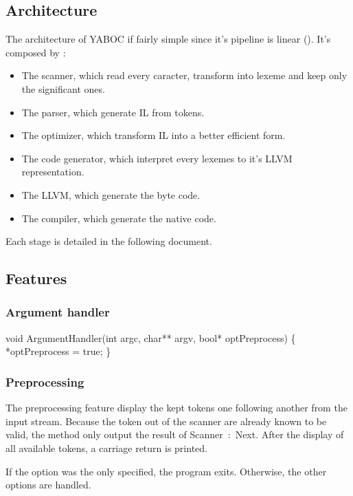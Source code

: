 \subsection{Architecture}
The architecture of \gls{YABOC} if fairly simple since it's pipeline is linear (\cf {}).
It's composed by :
\begin{itemize}
        \item The scanner, which read every caracter, transform into \gls{lexeme} and keep only the significant ones.
        \item The parser, which generate \gls{IL} from tokens.
        \item The optimizer, which transform \gls{IL} into a better efficient form.
        \item The code generator, which interpret every lexemes to it's LLVM representation.
        \item The LLVM, which generate the byte code.
        \item The compiler, which generate the native code.
\end{itemize}

\newpar Each stage is detailed in the following document.

\subsection{Features}
\subsubsection{Argument handler}
\nwenddocs{}\endmoddef\nwstartdeflinemarkup\nwenddeflinemarkup
void ArgumentHandler(int argc, char** argv, bool* optPreprocess) \{
        *optPreprocess = true;
\}
\nwendcode{}\nwdocspar

\subsubsection{Preprocessing}
The preprocessing feature display the kept tokens one following another from the input stream. Because the token out of the scanner are already known to be valid, the method only output the result of {\Tt{}Scanner\ :\ Next\nwendquote}. After the display of all available tokens, a carriage return is printed.

\newpar If the option was the only specified, the program exits. Otherwise, the other options are handled.

